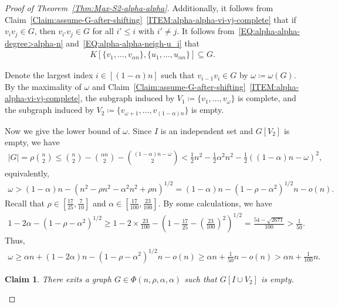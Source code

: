 \documentclass[11pt,a4paper]{article}
\newtheorem{claim}[definition]{Claim}
\begin{document}
\begin{proof}[Proof of Theorem~\ref{Thm:Max-S2-alpha-alpha}]
Additionally, it follows from Claim~\ref{Claim:assume-G-after-shifting}~\ref{ITEM:alpha-alpha-vi-vj-complete} that if $v_iv_j\in G$, then $v_{i'} v_j \in G$ for all $i' \le i$ with $i' \neq j$. 
It follows from~\eqref{EQ:alpha-alpha-degree>alpha-n} and~\eqref{EQ:alpha-alpha-neigh-u_i} that 
\begin{align*}
K[\{v_1, \ldots,v_{\alpha n}\}, \{u_1, \ldots,u_{\alpha n}\}] \subseteq G. 
\end{align*}

Denote the largest index $i \in [(1-\alpha)n]$ such that $v_{i-1}v_i\in  G$ by $\omega \coloneqq \omega(G)$. 
By the maximality of $\omega$ and Claim~\ref{Claim:assume-G-after-shifting}~\ref{ITEM:alpha-alpha-vi-vj-complete}, the subgraph induced by $V_1 \coloneqq  \{v_1,\ldots, v_{\omega}\}$ is complete, and the subgraph induced by $V_2\coloneqq  \{v_{\omega+1},\ldots, v_{(1-\alpha)n}\}$ is empty. 

Now we give the lower bound of $\omega$. 
Since $I$ is an independent set and $G[V_2]$ is empty, we have 
\begin{align*}
|G| 
= \rho \binom{n}{2} 
\le \binom{n}{2} - \binom{\alpha n}{2} -\binom{(1-\alpha)n -\omega}{2}
< \frac{1}{2}n^2 - \frac{1}{2}\alpha^2 n^2 -\frac{1}{2}\left((1-\alpha)n -\omega\right)^2, 
\end{align*}
equivalently, 
\begin{align*}
\omega 
> (1-\alpha)n - \left(n^2-\rho n^2 -\alpha^2 n^2 + \rho n\right)^{1/2}
= (1-\alpha)n - \left(1-\rho -\alpha^2 \right)^{1/2}n - o(n). 
\end{align*}
Recall that $\rho \in \left[\frac{17}{25}, \frac{7}{10} \right]$ and $\alpha \in \left[\frac{17}{100}, \frac{23}{100}\right]$.  
By some calculations, we have 
\begin{align*}
1-2 \alpha- \left(1-\rho -\alpha^2 \right)^{1/2} 
\ge 1-2\times \frac{23}{100}- \left(1-\frac{17}{25}-\left(\frac{23}{100}\right)^2 \right)^{1/2}
= \frac{54-\sqrt{2671}}{100} 
> \frac{1}{50}. 
\end{align*}
Thus, 
\begin{align}\label{EQ:lower-bound-omega}
\omega
\ge \alpha n + (1-2\alpha)n - \left(1-\rho -\alpha^2 \right)^{1/2}n - o(n)
\ge \alpha n + \frac{1}{50}n - o(n)
> \alpha n + \frac{1}{100}n. 
\end{align}

\begin{claim}\label{CLAIM:alpha-B_0-empty}
There exits a graph $G \in \Phi(n, \rho, \alpha, \alpha)$ such that $G[I \cup V_2]$ is empty. 
\end{claim}


\end{proof}
\end{document}
